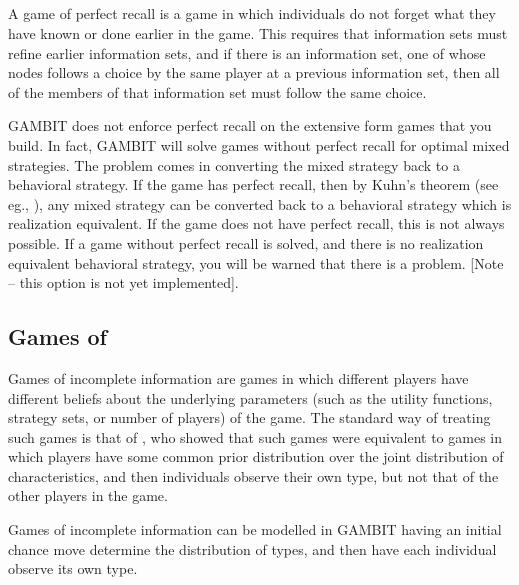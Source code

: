 \subsection{}\label{perfrecallsec}
A game of perfect recall is a game in which individuals do not forget what
they have known or done earlier in the game.  This requires that
information sets must refine earlier information sets, and if there is
an information set, one of whose nodes follows a choice by the same player
at a previous information set, then all of the members of that information
set must follow the same choice.

GAMBIT does not enforce perfect recall on the extensive form games that
you build.  In fact, GAMBIT will solve games without perfect recall for
 optimal
mixed strategies.  The problem comes in converting the mixed strategy back
to a behavioral strategy.  If the game has perfect recall, then by Kuhn's
theorem (see eg., \cite{vanDamme:1983}), any mixed strategy can be
converted back to a behavioral strategy which is realization equivalent.  
If the game does not have perfect recall, this is not always possible.  If
a game without perfect recall is solved, and there is no realization
equivalent behavioral strategy, you will be warned that there is a
problem. [Note -- this option is not yet implemented].  
 

\subsection{Games of }\label{incinfsec}
Games of incomplete information are games in which different players have 
different beliefs about the underlying parameters (such as the utility 
functions, strategy sets, or number of players) of the game.  The standard 
way of treating such games is that of \cite{Harsanyi:1967}, who showed that
 such games were equivalent to games in which players have some common
prior distribution over the joint distribution of characteristics, and
 then individuals observe their own type, but not that of the other players 
in the game.  

Games of incomplete information can be modelled in GAMBIT having an initial 
chance move determine the distribution of types, and then have each 
individual observe its own type.    


